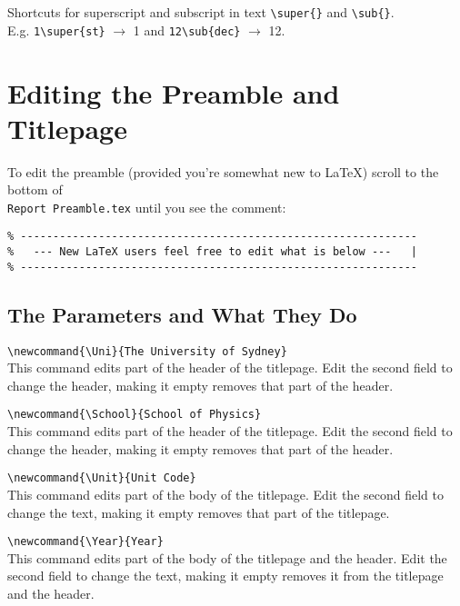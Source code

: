 \documentclass[a4paper, 12pt, english]{article}
\begin{document}
            Shortcuts for superscript and subscript in text \verb+\super{}+ and \verb+\sub{}+.\\
            E.g. \verb+1\super{st}+ $\to$ 1 and \verb+12\sub{dec}+ $\to$ 12.


        
    \section{Editing the Preamble and Titlepage}
        \label{sec: editing the preamble}

        To edit the preamble (provided you're somewhat new to \LaTeX) scroll to the bottom of \\\verb+Report Preamble.tex+ until you see the comment:

        \begin{lstlisting}
% -------------------------------------------------------------
%   --- New LaTeX users feel free to edit what is below ---   |
% -------------------------------------------------------------
        \end{lstlisting}



        \subsection{The Parameters and What They Do}
            \label{subsec: the parameters and what they do}

            \verb+\newcommand{\Uni}{The University of Sydney}+\\
            This command edits part of the header of the titlepage. Edit the second field to change the header, making it empty removes that part of the header.

            \verb+\newcommand{\School}{School of Physics}+\\
            This command edits part of the header of the titlepage. Edit the second field to change the header, making it empty removes that part of the header.

            \verb+\newcommand{\Unit}{Unit Code}+\\
            This command edits part of the body of the titlepage. Edit the second field to change the text, making it empty removes that part of the titlepage.

            \verb+\newcommand{\Year}{Year}+\\
            This command edits part of the body of the titlepage and the header. Edit the second field to change the text, making it empty removes it from the titlepage and the header.
\end{document}
